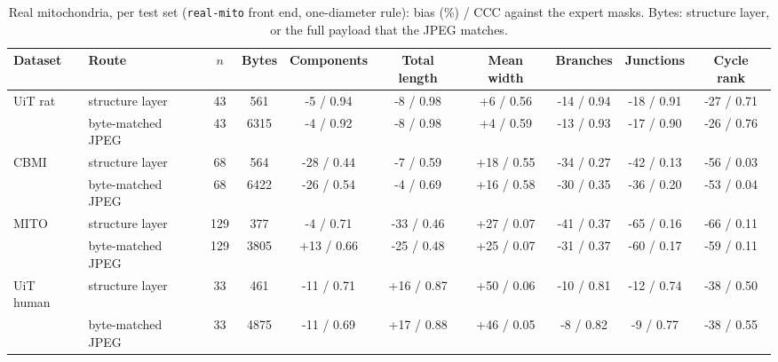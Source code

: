 \begin{table}[h]
\centering
\caption{Real mitochondria, per test set (\texttt{real-mito} front end, one-diameter rule): bias (\%) / CCC against the expert masks. Bytes: structure layer, or the full payload that the JPEG matches.}
\label{tab:supp-real}
\footnotesize
\begin{adjustbox}{max width=\linewidth}
\begin{tabular}{llcccccccc}
\toprule
Dataset & Route & $n$ & Bytes & Components & Total length & Mean width & Branches & Junctions & Cycle rank\\
\midrule
UiT rat & structure layer & 43 & 561 & -5 / 0.94 & -8 / 0.98 & +6 / 0.56 & -14 / 0.94 & -18 / 0.91 & -27 / 0.71\\
 & byte-matched JPEG & 43 & 6315 & -4 / 0.92 & -8 / 0.98 & +4 / 0.59 & -13 / 0.93 & -17 / 0.90 & -26 / 0.76\\
\midrule
CBMI & structure layer & 68 & 564 & -28 / 0.44 & -7 / 0.59 & +18 / 0.55 & -34 / 0.27 & -42 / 0.13 & -56 / 0.03\\
 & byte-matched JPEG & 68 & 6422 & -26 / 0.54 & -4 / 0.69 & +16 / 0.58 & -30 / 0.35 & -36 / 0.20 & -53 / 0.04\\
\midrule
MITO & structure layer & 129 & 377 & -4 / 0.71 & -33 / 0.46 & +27 / 0.07 & -41 / 0.37 & -65 / 0.16 & -66 / 0.11\\
 & byte-matched JPEG & 129 & 3805 & +13 / 0.66 & -25 / 0.48 & +25 / 0.07 & -31 / 0.37 & -60 / 0.17 & -59 / 0.11\\
\midrule
UiT human & structure layer & 33 & 461 & -11 / 0.71 & +16 / 0.87 & +50 / 0.06 & -10 / 0.81 & -12 / 0.74 & -38 / 0.50\\
 & byte-matched JPEG & 33 & 4875 & -11 / 0.69 & +17 / 0.88 & +46 / 0.05 & -8 / 0.82 & -9 / 0.77 & -38 / 0.55\\
\bottomrule
\end{tabular}
\end{adjustbox}
\end{table}
